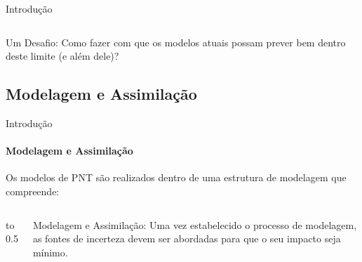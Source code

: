 \documentclass[10pt,aspectratio=169]{beamer}
\begin{document}
\begin{frame}[fragile]{Introdução}
\begin{columns}[onlytextwidth,T]
  \end{columns}
  \pause
  \begin{block}{Um Desafio:}
    \vspace{0.5em}
    Como fazer com que os modelos atuais possam prever bem dentro deste limite (e além dele)?
  \end{block}
\end{frame}

\subsection{Modelagem e Assimilação}

\begin{frame}[fragile]{Introdução}
\framesubtitle{Modelagem e Assimilação}
  Os modelos de PNT são realizados dentro de uma estrutura de modelagem que compreende:
  \begin{columns}
      \vbox to 0.5
	  \vspace{2em}
    \begin{block}{Modelagem e Assimilação:}
      \vspace{0.5em}
      Uma vez estabelecido o processo de modelagem, as fontes de incerteza devem ser abordadas para que o seu impacto seja mínimo.
    \end{block}
  \end{columns} 
\end{frame}
\end{document}
